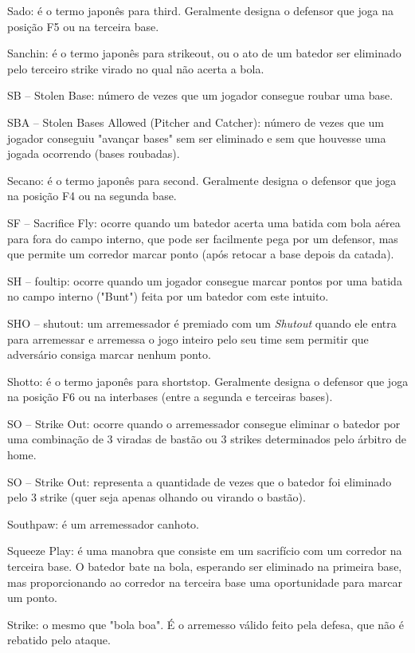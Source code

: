  Sado: é o termo japonês para \gls{third}. Geralmente designa o defensor que joga na posição F5 ou na terceira base.

 Sanchin: é o termo japonês para \gls{strikeout}, ou o ato de um batedor ser eliminado pelo terceiro strike virado no qual não acerta a bola.

 SB -- Stolen Base: número de vezes que um jogador consegue roubar uma base.

 SBA -- Stolen Bases Allowed (Pitcher and Catcher): número de vezes que um jogador conseguiu "avançar bases" sem ser eliminado e sem que houvesse uma
 jogada ocorrendo (bases roubadas).

 Secano: é o termo japonês para \gls{second}. Geralmente designa o defensor que joga na posição F4 ou na segunda base.

 SF -- Sacrifice Fly: ocorre quando um batedor acerta uma batida com bola aérea para fora do campo interno, que pode ser facilmente pega por um defensor, mas que permite um corredor marcar ponto (após retocar a base depois da catada).

 SH -- \gls{foultip}: ocorre quando um jogador consegue marcar pontos por uma batida no campo interno ("Bunt") feita por um batedor com este intuito.

 SHO -- \gls{shutout}: um arremessador é premiado com um \textit{Shutout} quando ele entra para arremessar e arremessa o jogo inteiro pelo seu time sem permitir que
 adversário consiga marcar nenhum ponto.

 Shotto: é o termo japonês para \gls{shortstop}. Geralmente designa o defensor que joga na posição F6 ou na interbases (entre a segunda e terceiras bases).

 SO -- Strike Out: ocorre quando o arremessador consegue eliminar o batedor por uma combinação de 3 viradas de bastão ou 3 strikes determinados pelo árbitro de \gls{home}.

 SO -- Strike Out: representa a quantidade de vezes que o batedor foi eliminado pelo 3 strike (quer seja apenas olhando ou virando o bastão).

 Southpaw: é um arremessador canhoto.

 Squeeze Play: é uma manobra que consiste em um sacrifício com um corredor na terceira base. O batedor bate na bola, esperando ser eliminado na primeira base, mas proporcionando ao corredor na terceira base uma oportunidade para marcar um ponto.

 Strike: o mesmo que "bola boa". É o arremesso válido feito pela defesa, que não é rebatido pelo ataque.

